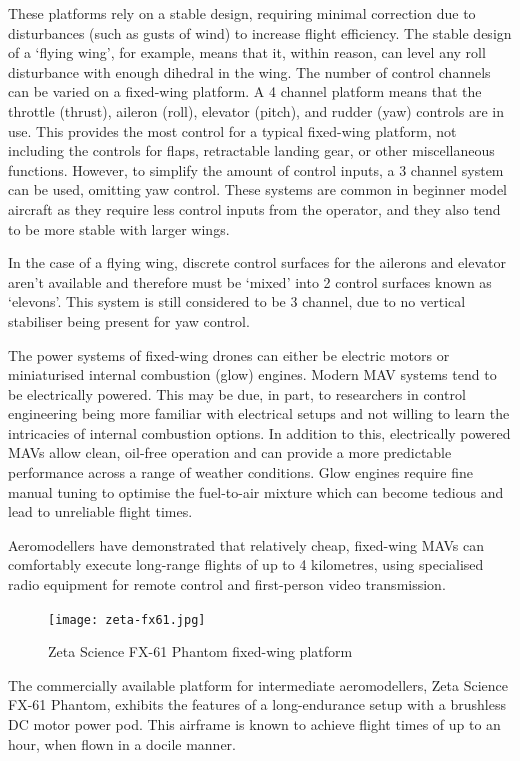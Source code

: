 These platforms rely on a stable design, requiring minimal correction due to disturbances (such as gusts of wind) to increase flight efficiency. The stable design of a ‘flying wing’, for example, means that it, within reason, can level any roll disturbance with enough dihedral in the wing.
The number of control channels can be varied on a fixed-wing platform. A 4 channel platform means that the throttle (thrust), aileron (roll), elevator (pitch), and rudder (yaw) controls are in use. This provides the most control for a typical fixed-wing platform, not including the controls for flaps, retractable landing gear, or other miscellaneous functions. However, to simplify the amount of control inputs, a 3 channel system can be used, omitting yaw control. These systems are common in beginner model aircraft as they require less control inputs from the operator, and they also tend to be more stable with larger wings.

In the case of a flying wing, discrete control surfaces for the ailerons and elevator aren’t available and therefore must be ‘mixed’ into 2 control surfaces known as ‘elevons’. This system is still considered to be 3 channel, due to no vertical stabiliser being present for yaw control.

The power systems of fixed-wing drones can either be electric motors or miniaturised internal combustion (glow) engines. Modern MAV systems tend to be electrically powered. This may be due, in part, to researchers in control engineering being more familiar with electrical setups and not willing to learn the intricacies of internal combustion options. In addition to this, electrically powered MAVs allow clean, oil-free operation and can provide a more predictable performance across a range of weather conditions. Glow engines require fine manual tuning to optimise the fuel-to-air mixture which can become tedious and lead to unreliable flight times.

Aeromodellers have demonstrated that relatively cheap, fixed-wing MAVs can comfortably execute long-range flights of up to 4 kilometres, using specialised radio equipment for remote control and first-person video transmission.

\begin{figure}
    \centering
    \texttt{[image: zeta-fx61.jpg]}
    \caption{Zeta Science FX-61 Phantom fixed-wing platform}
    \label{fig:zeta-fx61}
\end{figure}

The commercially available platform for intermediate aeromodellers, Zeta Science FX-61 Phantom, exhibits the features of a long-endurance setup with a brushless DC motor power pod. This airframe is known to achieve flight times of up to an hour, when flown in a docile manner.

